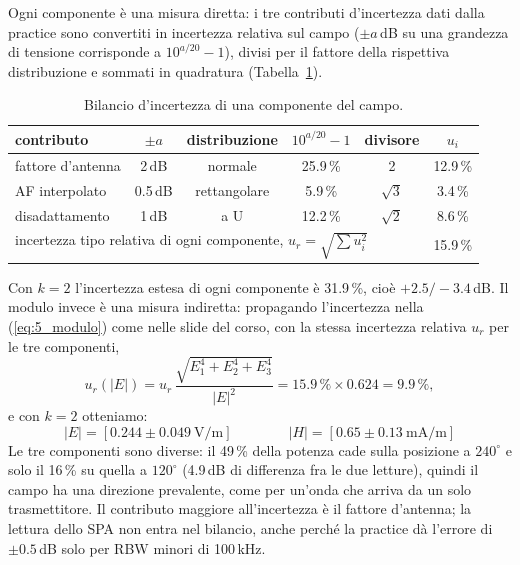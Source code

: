 \documentclass[11pt,a4paper,oneside]{book}
\begin{document}
Ogni componente è una misura diretta: i tre contributi d'incertezza dati dalla practice sono convertiti in incertezza relativa sul campo ($\pm a$\,dB su una grandezza di tensione corrisponde a $10^{a/20}-1$), divisi per il fattore della rispettiva distribuzione e sommati in quadratura (Tabella~\ref{tab:5_4_budget}).

\begin{table}[H]
\centering\small
\renewcommand{\arraystretch}{1.2}
\begin{tabular}{l|c|c|c|c|c}
\hline
contributo & $\pm a$ & distribuzione & $10^{a/20}-1$ & divisore & $u_i$ \\ \hline
fattore d'antenna & 2\,dB & normale & 25.9\,\% & 2 & 12.9\,\% \\
AF interpolato & 0.5\,dB & rettangolare & 5.9\,\% & $\sqrt3$ & 3.4\,\% \\
disadattamento & 1\,dB & a U & 12.2\,\% & $\sqrt2$ & 8.6\,\% \\ \hline
\multicolumn{5}{l|}{incertezza tipo relativa di ogni componente, $u_r = \sqrt{\textstyle\sum u_i^2}$} & 15.9\,\% \\ \hline
\end{tabular}
\caption{Bilancio d'incertezza di una componente del campo.}
\label{tab:5_4_budget}
\end{table}

Con $k = 2$ l'incertezza estesa di ogni componente è 31.9\,\%, cioè $+2.5/-3.4$\,dB. Il modulo invece è una misura indiretta: propagando l'incertezza nella (\ref{eq:5_modulo}) come nelle slide del corso, con la stessa incertezza relativa $u_r$ per le tre componenti,
\begin{equation}
u_r(|E|) = u_r\,\frac{\sqrt{E_1^4 + E_2^4 + E_3^4}}{|E|^2} = 15.9\,\% \times 0.624 = 9.9\,\%,
\end{equation}
e con $k = 2$ otteniamo:
\begin{equation}
|E| = [0.244 \pm 0.049\ \mathrm{V/m}] \qquad\qquad |H| = [0.65 \pm 0.13\ \mathrm{mA/m}]
\end{equation}
Le tre componenti sono diverse: il 49\,\% della potenza cade sulla posizione a $240^\circ$ e solo il 16\,\% su quella a $120^\circ$ (4.9\,dB di differenza fra le due letture), quindi il campo ha una direzione prevalente, come per un'onda che arriva da un solo trasmettitore. Il contributo maggiore all'incertezza è il fattore d'antenna; la lettura dello SPA non entra nel bilancio, anche perché la practice dà l'errore di $\pm 0.5$\,dB solo per RBW minori di 100\,kHz.

\end{document}
